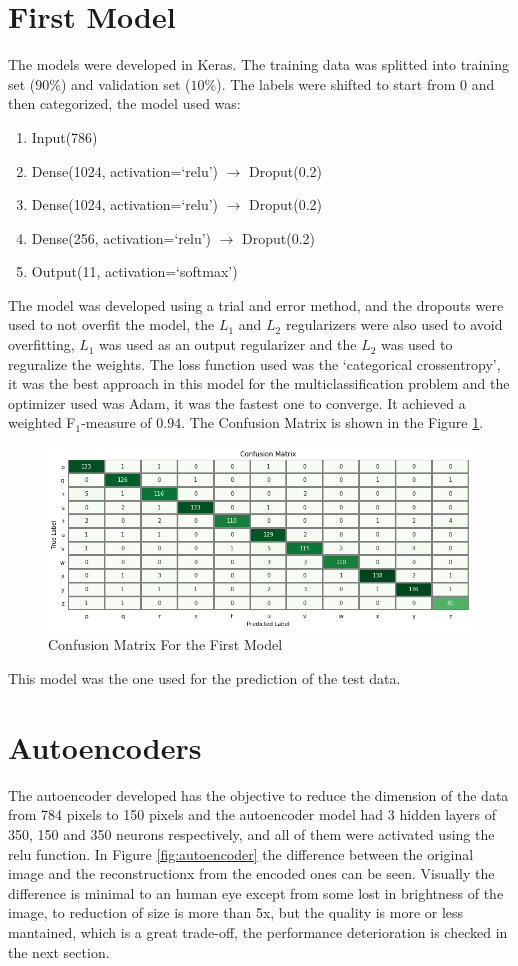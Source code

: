 \documentclass[11pt]{article}
\begin{document}
\section*{First Model}
The models were developed in Keras. The training data was splitted into training set ($90\%$) and validation set ($10\%$).
The labels were shifted to start from 0 and then categorized, the model used was:
\begin{enumerate}[noitemsep, topsep=0ex]
	\item Input(786)
	\item Dense(1024, activation=`relu') $\to$ Droput(0.2)
	\item Dense(1024, activation=`relu') $\to$ Droput(0.2)
	\item Dense(256, activation=`relu') $\to$ Droput(0.2)
	\item Output(11, activation=`softmax')
\end{enumerate}
The model was developed using a trial and error method, and the dropouts were used to not overfit the model, the $L_1$ and $L_2$ regularizers were also used to avoid overfitting, $L_1$ was used as an output regularizer and the $L_2$ was used to reguralize the weights. 
The loss function used was the `categorical crossentropy', it was the best approach in this model for the multiclassification problem and the optimizer used was Adam, it was the fastest one to converge. It achieved a weighted F$_1$-measure of $0.94$. The Confusion Matrix is shown in the Figure \ref{fig:model1}.
\begin{figure}
	\centering
	\includegraphics[width=\linewidth]{imgs/model_1.png}
	\caption{Confusion Matrix For the First Model}
	\label{fig:model1}
\end{figure}
This model was the one used for the prediction of the test data.

\section*{Autoencoders}
The autoencoder developed has the objective to reduce the dimension of the data from 784 pixels to 150 pixels and the autoencoder model had 3 hidden layers of 350, 150 and 350 neurons respectively, and all of them were activated using the relu function. In Figure \ref{fig:autoencoder} the difference between the original image and the reconstructionx from the encoded ones can be seen. Visually the difference is minimal to an human eye except from some lost in brightness of the image, to reduction of size is more than 5x, but the quality is more or less mantained, which is a great trade-off, the performance deterioration is checked in the next section.
\end{document}
